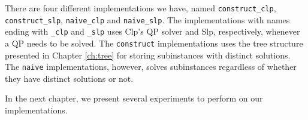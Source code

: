 There are four different implementations we have, named
\texttt{construct\_clp}, \texttt{construct\_slp}, \texttt{naive\_clp} and
\texttt{naive\_slp}. The implementations with names ending with
\texttt{\_clp} and \texttt{\_slp} uses Clp's QP solver and Slp, respectively,
whenever a QP needs to be solved.
The \texttt{construct} implementations uses the tree structure presented
in Chapter \ref{ch:tree} for storing subinstances with distinct solutions.
The \texttt{naive} implementations, however, solves subinstances regardless of
whether they have distinct solutions or not.

In the next chapter, we present several experiments to perform on our
implementations.
